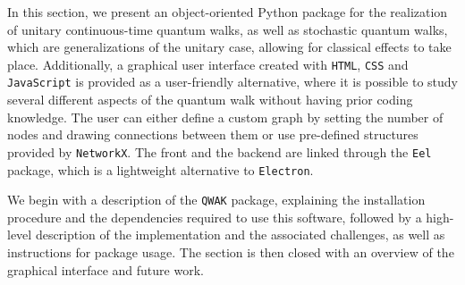 \documentclass[main.tex]{subfiles}
\begin{document}
In this section, we present an object-oriented Python package for the
realization of unitary continuous-time quantum walks, as well as stochastic
quantum walks, which are generalizations of the unitary case, allowing for
classical effects to take place. Additionally, a graphical user interface
created with \texttt{HTML}, \texttt{CSS} and \texttt{JavaScript} is provided as
a user-friendly alternative, where it is possible to study several different
aspects of the quantum walk without having prior coding knowledge. The user can
either define a custom graph by setting the number of nodes and drawing
connections between them or use pre-defined structures provided by
\texttt{NetworkX}. The front and the backend are linked through the
\texttt{Eel} package, which is a lightweight alternative to \texttt{Electron}.\par

We begin with a description of the \texttt{QWAK} package, explaining the
installation procedure and the dependencies required to use this software,
followed by a high-level description of the implementation and the associated
challenges, as well as instructions for package usage. The
section is then closed with an overview of the graphical interface and future
work.
 
\end{document}
